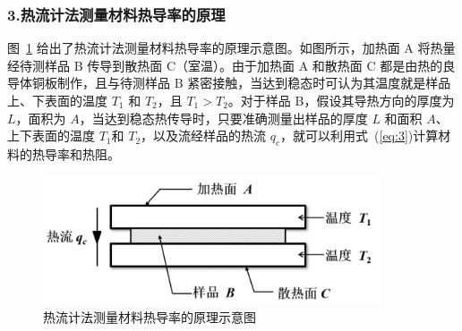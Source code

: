 \documentclass[a4paper,utf8]{article}
\newcommand{\fgref}[1]{图~\ref{#1} }
\newcommand{\seqref}[1]{式~(\ref{#1})}
\begin{document}
        \subsubsection*{3.热流计法测量材料热导率的原理}
            \fgref{fg:1} 给出了热流计法测量材料热导率的原理示意图。如图所示，加热面 A 将热量经待测样品 B 传导到散热面 C（室温）。由于加热面 A 和散热面 C 都是由热的良导体铜板制作，且与待测样品 B 紧密接触，当达到稳态时可认为其温度就是样品上、下表面的温度 $T_1$ 和 $T_2$，且 $T_1 > T_2$。对于样品 B，假设其导热方向的厚度为 $L$，面积为 $A$，当达到稳态热传导时，只要准确测量出样品的厚度 $L$ 和面积 $A$、上下表面的温度 $T_1$和 $T_2$，以及流经样品的热流 $q_c$，就可以利用\seqref{eq:3}计算材料的热导率和热阻。
            \begin{figure}[!ht]\centering
                \includegraphics[width=100mm]{fg1.png}
                \caption{热流计法测量材料热导率的原理示意图 \label{fg:1}}
            \end{figure}
\end{document}
